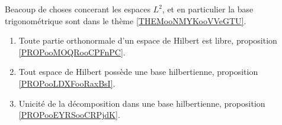 
	\label{THEMEooHilbert}
Beacoup de choses concerant les espaces \( L^2\), et en particulier la base trigonométrique sont dans le thème \ref{THEMooNMYKooVVeGTU}.
\begin{enumerate}
	\item
	      Toute partie orthonormale d'un espace de Hilbert est libre, proposition \ref{PROPooMOQRooCPFnPC}.
	\item
	      Tout espace de Hilbert possède une base hilbertienne, proposition \ref{PROPooLDXFooRaxBsI}.
	\item
	      Unicité de la décomposition dans une base hilbertienne, proposition \ref{PROPooEYRSooCRPjdK}.
\end{enumerate}
